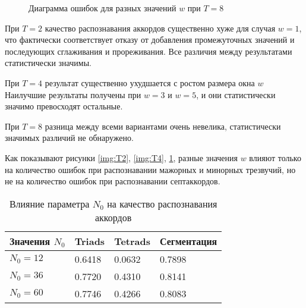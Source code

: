 \begin{figure}[h]
  \begin{minipage}[h]{0.49\linewidth}
  \end{minipage}
  \hfill
  \begin{minipage}[h]{0.49\linewidth}
  \end{minipage}
  \caption{Диаграмма ошибок для разных значений $w$ при $T=8$}
  \label{img:T8}
\end{figure}

При $T=2$ качество распознавания аккордов существенно хуже для случая $w=1$, что
фактически соответствует отказу от добавления промежуточных значений и
последующих сглаживания и прореживания. Все различия между результатами
статистически значимы.

При $T=4$ результат существенно ухудшается с ростом размера окна $w$ Наилучшие
результаты получены при $w=3$ и $w=5$, и они статистически значимо превосходят
остальные.

При $T=8$ разница между всеми вариантами очень невелика, статистически значимых
различий не обнаружено.

Как показывают рисунки \ref{img:T2}, \ref{img:T4}, \ref{img:T8}, разные значения
$w$ влияют только на количество ошибок при распознавании мажорных и минорных
трезвучий, но не на количество ошибок при распознавании септаккордов.

% 

\begin{table} [htbp]
  \centering
  \parbox{15cm}{\caption{Влияние параметра $N_0$ на качество распознавания
  аккордов} \label{TN0}}
  \begin{tabular}{|l|l|l|l|}
  \hline
  Значения $N_0$ & Triads & Tetrads & Сегментация \\
  \hline
  $N_0 = 12$ & 0.6418 & 0.0632 & 0.7898 \\
  $N_0 = 36$ & 0.7720 & 0.4310 & 0.8141 \\
  $N_0 = 60$ & 0.7746 & 0.4266 & 0.8083 \\
  \hline
  \end{tabular}
\end{table}

